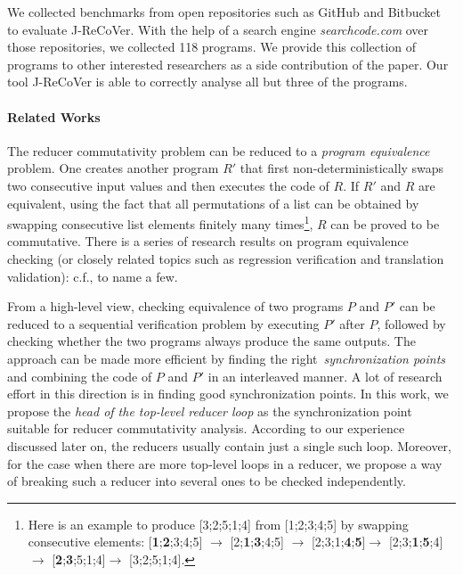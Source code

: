 \documentclass{llncs}
\begin{document}
We collected benchmarks from open repositories such as GitHub and Bitbucket to
evaluate J-ReCoVer. With the help of a search engine \emph{searchcode.com} over
those repositories, we collected 118 programs. We provide this collection of
programs to other interested researchers as a side contribution of the paper.
Our tool J-ReCoVer is able to correctly analyse all but three of the programs.

\paragraph*{Related Works}

The reducer commutativity problem can be reduced to a \emph{program equivalence}
problem. One creates another program $R'$ that first non-deterministically swaps
two consecutive input values and then executes the code of $R$. If $R'$ and $R$
are equivalent, using the fact that all permutations of a list can be obtained
by swapping consecutive list elements finitely many times\footnote{Here is an
example to produce [3;2;5;1;4] from [1;2;3;4;5] by swapping consecutive
elements: [\textbf{1};\textbf{2};3;4;5] $\rightarrow$
[2;\textbf{1};\textbf{3};4;5] $\rightarrow$
[2;3;1;\textbf{4};\textbf{5}]$\rightarrow$
[2;3;\textbf{1};\textbf{5};4]$\rightarrow$
[\textbf{2};\textbf{3};5;1;4]$\rightarrow$ [3;2;5;1;4].}, $R$ can be proved to
be commutative. There is a series of research results on program equivalence
checking (or closely related topics such as regression verification and
translation validation): c.f.,
\cite{Pnueli:1998:TV,fedyukovich2015automated,barthe2011relational,KlebanovRuemmerUlbrich2017}
to name a few. 

From a high-level view, checking equivalence of two programs $P$ and $P'$ can be
reduced to a sequential verification problem by executing $P'$ after $P$,
followed by checking whether the two programs always produce the same outputs.
The approach can be made more efficient by finding the
right~\emph{synchronization points} and combining the code of $P$ and $P'$ in an
interleaved manner. A lot of research effort in this direction is in finding
good synchronization points. In this work, we propose the \emph{head of the
top-level reducer loop} as the synchronization point suitable for reducer
commutativity analysis. According to our experience discussed later on, the
reducers usually contain just a single such loop. Moreover, for the case when
there are more top-level loops in a reducer, we propose a way of breaking such a
reducer into several ones to be checked independently.
\end{document}
